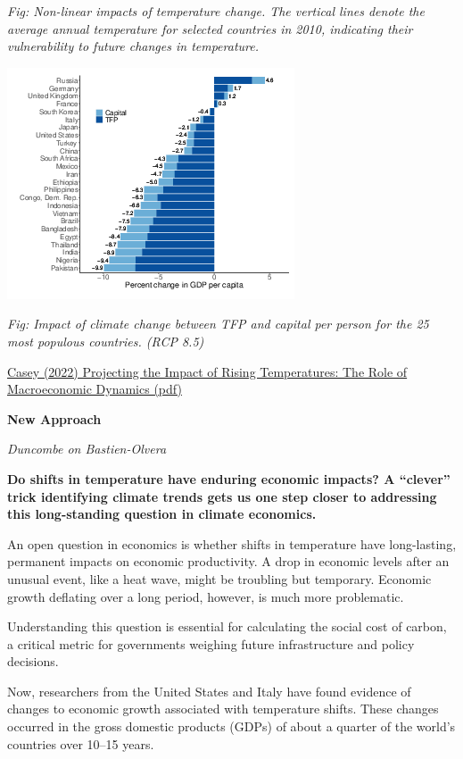 \documentclass[
]{book}
\begin{document}
\emph{Fig: Non-linear impacts of temperature change. The vertical
lines denote the average annual temperature for selected countries in 2010, indicating their
vulnerability to future changes in temperature.}

\includegraphics{fig/casey_countries.png}

\emph{Fig: Impact of climate change between TFP and capital per
person for the 25 most populous countries. (RCP 8.5)}

\href{pdf/Casey_2022_Impact_of_Rising_Temperature_Macro_Dynamics.pdf}{Casey (2022) Projecting the Impact of Rising Temperatures: The Role of Macroeconomic Dynamics (pdf)}

\textbf{New Approach}

\emph{Duncombe on Bastien-Olvera}

\textbf{Do shifts in temperature have enduring economic impacts? A ``clever'' trick identifying climate trends gets us one step closer to addressing this long-standing question in climate economics.}

An open question in economics is whether shifts in temperature have long-lasting, permanent impacts on economic productivity. A drop in economic levels after an unusual event, like a heat wave, might be troubling but temporary. Economic growth deflating over a long period, however, is much more problematic.

Understanding this question is essential for calculating the social cost of carbon, a critical metric for governments weighing future infrastructure and policy decisions.

Now, researchers from the United States and Italy have found evidence of changes to economic growth associated with temperature shifts. These changes occurred in the gross domestic products (GDPs) of about a quarter of the world's countries over 10--15 years.
\end{document}
